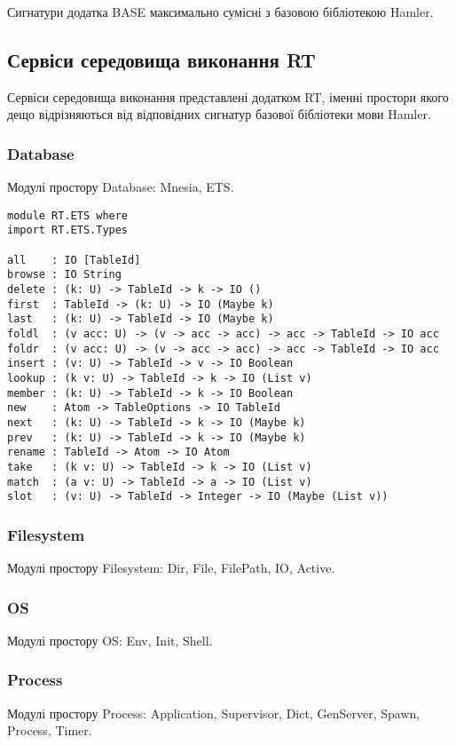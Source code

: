 Сигнатури додатка BASE максимально сумісні з базовою бібліотекою Hamler.

\subsection{Сервіси середовища виконання RT}
Сервіси середовища виконання представлені додатком RT, іменні простори якого
дещо відрізняються від відповідних сигнатур базової бібліотеки мови Hamler.

\subsubsection{Database}
Модулі простору Database: Mnesia, ETS.

\begin{lstlisting}
module RT.ETS where
import RT.ETS.Types

all    : IO [TableId]
browse : IO String
delete : (k: U) -> TableId -> k -> IO ()
first  : TableId -> (k: U) -> IO (Maybe k)
last   : (k: U) -> TableId -> IO (Maybe k)
foldl  : (v acc: U) -> (v -> acc -> acc) -> acc -> TableId -> IO acc
foldr  : (v acc: U) -> (v -> acc -> acc) -> acc -> TableId -> IO acc
insert : (v: U) -> TableId -> v -> IO Boolean
lookup : (k v: U) -> TableId -> k -> IO (List v)
member : (k: U) -> TableId -> k -> IO Boolean
new    : Atom -> TableOptions -> IO TableId
next   : (k: U) -> TableId -> k -> IO (Maybe k)
prev   : (k: U) -> TableId -> k -> IO (Maybe k)
rename : TableId -> Atom -> IO Atom
take   : (k v: U) -> TableId -> k -> IO (List v)
match  : (a v: U) -> TableId -> a -> IO (List v)
slot   : (v: U) -> TableId -> Integer -> IO (Maybe (List v))
\end{lstlisting}

\subsubsection{Filesystem}
Модулі простору Filesystem: Dir, File, FilePath, IO, Active.

\subsubsection{OS}
Модулі простору OS: Env, Init, Shell.

\subsubsection{Process}
Модулі простору Process: Application, Supervisor, Dict, GenServer, Spawn, Process, Timer.

